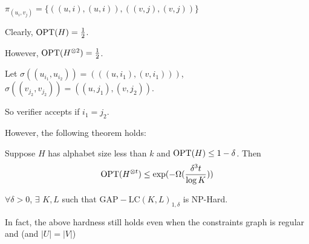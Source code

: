 $ \pi_{(u_i,v_j)}=\{((u,i),(u,i)),((v,j),(v,j))\} $ 

Clearly,  $ \mathrm{OPT}(H)=\frac{1}{2} $.

However,  $ \mathrm{OPT}(H^{\otimes 2})=\frac{1}{2} $.

Let  $ \sigma((u_{i_1},u_{i_2}))=(((u,i_1),(v,i_1))) $,  $ \sigma((v_{j_2},v_{j_2}))=((u,j_1),(v,j_2)) $.  

So verifier accepts if  $ i_1=j_2 $.

However, the following theorem holds:
\begin{theorem}
    Suppose  $ H  $ has alphabet size less than  $ k $ and  $ \mathrm{OPT}(H) \leq 1-\delta $.  Then 
    \[\mathrm{OPT}(H^{\otimes t}) \leq \exp(-\Omega(\frac{\delta^3t}{\log K}))\]  
\end{theorem}
\begin{corollary}\label{LC large theorem}
    $ \forall \delta>0 $,  $ \exists  $   $ K,L $ such that  $ \mathrm{GAP-LC}(K,L)_{1,\delta} $ is NP-Hard.  
\end{corollary}
In fact, the above hardness still holds even when the constraints graph is regular and (and  $ |U|=|V| $) 